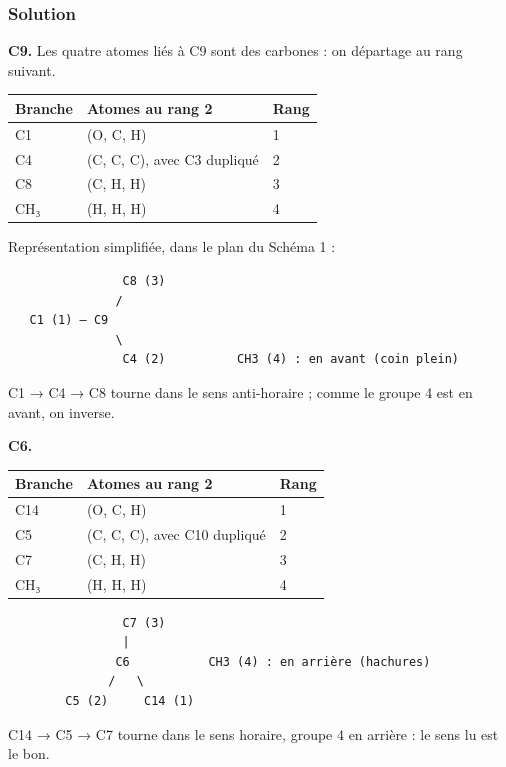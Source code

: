 \documentclass[11pt,a4paper]{article}
\newcommand{\equationajustee}[1]{%
  \sbox{\boiteequation}{$\displaystyle #1$}%
  \ifdim\wd\boiteequation>\linewidth
    \[\resizebox{\linewidth}{!}{\usebox{\boiteequation}}\]%
  \else
    \[#1\]%
  \fi}
\begin{document}
\hypertarget{solution-2}{%
\subsubsection{Solution}\label{solution-2}}

\textbf{C9.} Les quatre atomes liés à C9 sont des carbones : on départage au rang suivant.

\begin{longtable}[]{@{}lll@{}}
\toprule\noalign{}
Branche & Atomes au rang 2 & Rang \\
\midrule\noalign{}
\endhead
\bottomrule\noalign{}
\endlastfoot
C1 & (O, C, H) & 1 \\
C4 & (C, C, C), avec C3 dupliqué & 2 \\
C8 & (C, H, H) & 3 \\
CH₃ & (H, H, H) & 4 \\
\end{longtable}

Représentation simplifiée, dans le plan du Schéma 1 :

\begin{lstlisting}
                C8 (3)
               /
   C1 (1) — C9
               \
                C4 (2)          CH3 (4) : en avant (coin plein)
\end{lstlisting}

C1 → C4 → C8 tourne dans le sens anti-horaire ; comme le groupe 4 est en avant, on inverse.

\equationajustee{\boxed{\text{C9 : } R}}

\textbf{C6.}

\begin{longtable}[]{@{}lll@{}}
\toprule\noalign{}
Branche & Atomes au rang 2 & Rang \\
\midrule\noalign{}
\endhead
\bottomrule\noalign{}
\endlastfoot
C14 & (O, C, H) & 1 \\
C5 & (C, C, C), avec C10 dupliqué & 2 \\
C7 & (C, H, H) & 3 \\
CH₃ & (H, H, H) & 4 \\
\end{longtable}

\begin{lstlisting}
                C7 (3)
                |
               C6           CH3 (4) : en arrière (hachures)
              /   \
        C5 (2)     C14 (1)
\end{lstlisting}

C14 → C5 → C7 tourne dans le sens horaire, groupe 4 en arrière : le sens lu est le bon.
\end{document}
